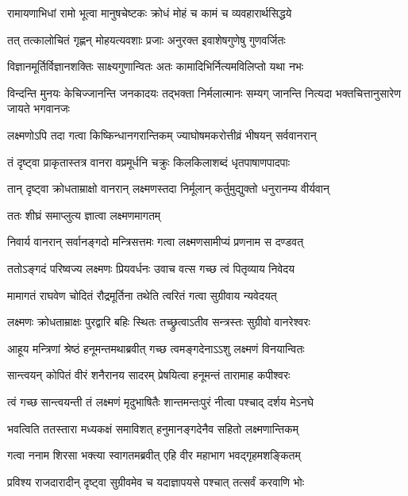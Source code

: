 \twolineshloka
{रामायणाभिधां रामो भूत्वा मानुषचेष्टकः}
{क्रोधं मोहं च कामं च व्यवहारार्थसिद्धये} %

\twolineshloka
{तत् तत्कालोचितं गृह्णन् मोहयत्यवशाः प्रजाः}
{अनुरक्त इवाशेषगुणेषु गुणवर्जितः} %

\twolineshloka
{विज्ञानमूर्तिर्विज्ञानशक्तिः साक्ष्यगुणान्वितः}
{अतः कामादिभिर्नित्यमविलिप्तो यथा नभः} %

\threelineshloka
{विन्दन्ति मुनयः केचिज्जानन्ति जनकादयः}
{तद्भक्ता निर्मलात्मानः सम्यग् जानन्ति नित्यदा}
{भक्तचित्तानुसारेण जायते भगवानजः} %

\twolineshloka
{लक्ष्मणोऽपि तदा गत्वा किष्किन्धानगरान्तिकम्}
{ज्याघोषमकरोत्तीव्रं भीषयन् सर्ववानरान्} %

\twolineshloka
{तं दृष्ट्वा प्राकृतास्तत्र वानरा वप्रमूर्धनि}
{चक्रुः किलकिलाशब्दं धृतपाषाणपादपाः} %

\twolineshloka
{तान् दृष्ट्वा क्रोधताम्राक्षो वानरान् लक्ष्मणस्तदा}
{निर्मूलान् कर्तुमुद्युक्तो धनुरानम्य वीर्यवान्} %

\onelineshloka
{ततः शीघ्रं समाप्लुत्य ज्ञात्वा लक्ष्मणमागतम्} %

\twolineshloka
{निवार्य वानरान् सर्वानङ्गदो मन्त्रिसत्तमः}
{गत्वा लक्ष्मणसामीप्यं प्रणनाम स दण्डवत्} %

\twolineshloka
{ततोऽङ्गदं परिष्वज्य लक्ष्मणः प्रियवर्धनः}
{उवाच वत्स गच्छ त्वं पितृव्याय निवेदय} %

\twolineshloka
{मामागतं राघवेण चोदितं रौद्रमूर्तिना}
{तथेति त्वरितं गत्वा सुग्रीवाय न्यवेदयत्} %

\twolineshloka
{लक्ष्मणः क्रोधताम्राक्षः पुरद्वारि बहिः स्थितः}
{तच्छ्रुत्वाऽतीव सन्त्रस्तः सुग्रीवो वानरेश्वरः} %

\twolineshloka
{आहूय मन्त्रिणां श्रेष्ठं हनूमन्तमथाब्रवीत्}
{गच्छ त्वमङ्गदेनाऽऽशु लक्ष्मणं विनयान्वितः} %

\twolineshloka
{सान्त्वयन् कोपितं वीरं शनैरानय सादरम्}
{प्रेषयित्वा हनूमन्तं तारामाह कपीश्वरः} %

\twolineshloka
{त्वं गच्छ सान्त्वयन्ती तं लक्ष्मणं मृदुभाषितैः}
{शान्तमन्तःपुरं नीत्वा पश्चाद् दर्शय मेऽनघे} %

\twolineshloka
{भवत्विति ततस्तारा मध्यकक्षं समाविशत्}
{हनुमानङ्गदेनैव सहितो लक्ष्मणान्तिकम्} %

\twolineshloka
{गत्वा ननाम शिरसा भक्त्या स्वागतमब्रवीत्}
{एहि वीर महाभाग भवद्गृहमशङ्कितम्} %

\twolineshloka
{प्रविश्य राजदारादीन् दृष्ट्वा सुग्रीवमेव च}
{यदाज्ञापयसे पश्चात् तत्सर्वं करवाणि भोः} %

